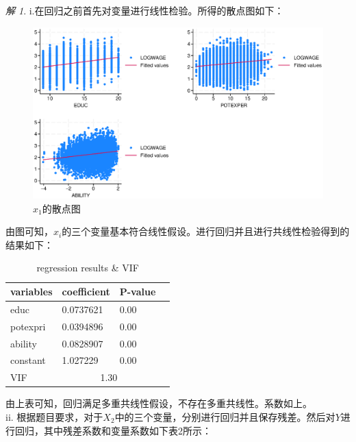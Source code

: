 \documentclass[a4paper]{ctexart}
\theoremstyle{remark}
\newtheorem*{solution}{解}
\begin{document}
\begin{itemize}
    \begin{solution}
        i.在回归之前首先对变量进行线性检验。所得的散点图如下：\\
        \begin{figure}[h]
            \centering
            \includegraphics[scale=0.8]{hw2i.eps}
            \caption{$x_1$的散点图}
        \end{figure}
        由图可知，$x_i$的三个变量基本符合线性假设。进行回归并且进行共线性检验得到的结果如下：
        \clearpage  
        \begin{table}[h]
            \centering
            \begin{tabular}{llll}%
                \hline
                variables & coefficient & P-value\\
                \hline
                educ &  0.0737621  & 0.00\\
                potexpri & 0.0394896  & 0.00\\
                ability & 0.0828907 & 0.00 \\
                constant & 1.027229 & 0.00\\
                VIF & \multicolumn{2}{c}{1.30}\\
                \hline
            \end{tabular} 
            \caption{\label{font-table} regression results \& VIF} 
        \end{table}
        由上表可知，回归满足多重共线性假设，不存在多重共线性。系数如上。\\
        ii. 根据题目要求，对于$X_2$中的三个变量，分别进行回归并且保存残差。然后对$Y$进行回归，其中残差系数和变量系数如下表2所示：
        \begin{table}[h]
            \centering

\end{table}
\end{solution}
\end{itemize}
\end{document}
